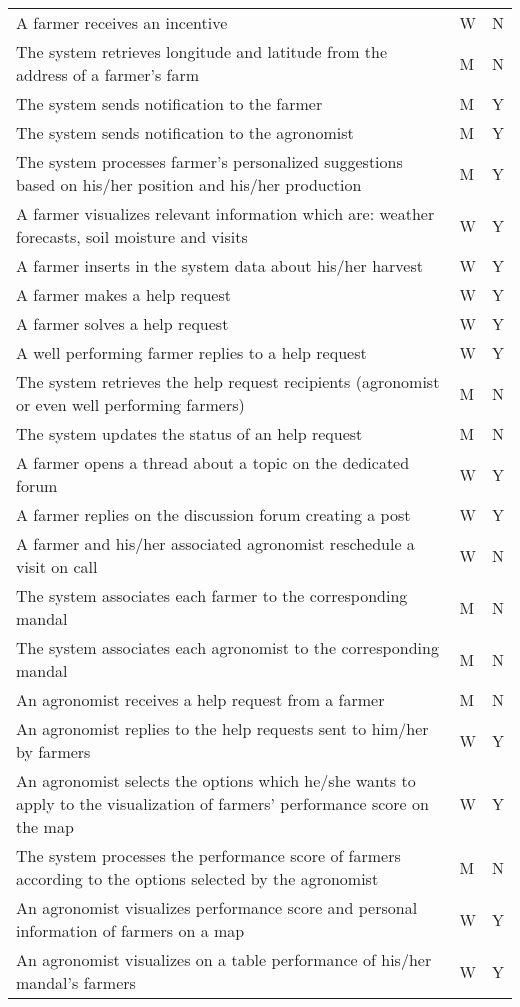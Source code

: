 \begin{center}
\begin{longtable}{ |m{7cm}|C{2.3cm}|C{1.6cm}|}
A farmer receives an incentive & W & N\\
The system retrieves longitude and latitude from the address of a farmer's farm & M & N\\
The system sends notification to the farmer & M & Y\\
The system sends notification to the agronomist & M & Y\\
The system processes farmer's personalized suggestions based on his/her position and his/her production & M & Y\\
A farmer visualizes relevant information which are: weather forecasts, soil moisture and visits & W & Y\\
A farmer inserts in the system data about his/her harvest & W & Y\\
A farmer makes a help request & W & Y\\
A farmer solves a help request & W & Y\\
A well performing farmer replies to a help request & W & Y\\
The system retrieves the help request recipients (agronomist or even well performing farmers) & M & N\\
The system updates the status of an help request & M & N\\
A farmer opens a thread about a topic on the dedicated forum & W & Y\\
A farmer replies on the discussion forum creating a post & W & Y\\
A farmer and his/her associated agronomist reschedule a visit on call & W & N\\
The system associates each farmer to the corresponding mandal & M & N\\
The system associates each agronomist to the corresponding mandal & M & N\\
An agronomist receives a help request from a farmer & M & N\\
An agronomist replies to the help requests sent to him/her by farmers & W & Y\\
An agronomist selects the options which he/she wants to apply to the visualization of farmers' performance score on the map & W & Y\\
The system processes the performance score of farmers according to the options selected by the agronomist & M & N\\
An agronomist visualizes performance score and personal information of farmers on a map & W & Y\\
An agronomist visualizes on a table performance of his/her mandal's farmers & W & Y\\

\end{longtable}
\end{center}
